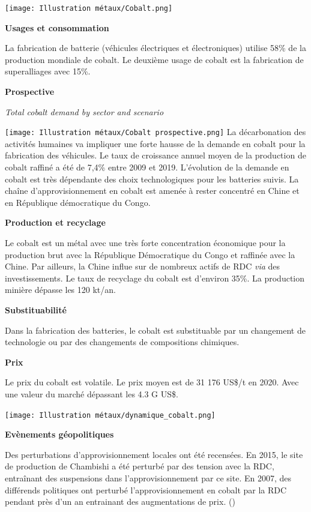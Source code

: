 \begin{center}
    \texttt{[image: Illustration métaux/Cobalt.png]}
\end{center}

\begin{center}
    \textbf{Usages et consommation}
\end{center}
La fabrication de batterie (véhicules électriques et électroniques) utilise 58\% de la production mondiale de cobalt. Le deuxième usage de cobalt est la fabrication de superalliages avec 15\%.
\begin{center}
    \textbf{Prospective}
\end{center}
\begin{multicols}{2}
    \begin{center}
        \textit{Total cobalt demand by sector and scenario}
    \end{center}
    \texttt{[image: Illustration métaux/Cobalt prospective.png]}
    \vfill\null
    \columnbreak
    La décarbonation des activités humaines va impliquer une forte hausse de la demande en cobalt pour la fabrication des véhicules. Le taux de croissance annuel moyen de la production de cobalt raffiné a été de 7,4\% entre 2009 et 2019. 
    L'évolution de la demande en cobalt est très dépendante des choix technologiques pour les batteries suivis. 
    La chaîne d'approvisionnement en cobalt est amenée à rester concentré en Chine et en République démocratique du Congo.
    
    
\end{multicols}
\begin{center}
    \textbf{Production et recyclage}
\end{center}
Le cobalt est un métal avec une très forte concentration économique pour la production brut avec la République Démocratique du Congo et raffinée avec la Chine. Par ailleurs, la Chine influe sur de nombreux actifs de RDC \textit{via} des investissements. Le taux de recyclage du cobalt est d'environ 35\%. La production minière dépasse les 120 kt/an.
\begin{center}
    \textbf{Substituabilité}
\end{center}
Dans la fabrication des batteries, le cobalt est substituable par un changement de technologie ou par des changements de compositions chimiques.
\begin{center}
    \textbf{Prix}
\end{center}
Le prix du cobalt est volatile. Le prix moyen est de 31 176 US\$/t en 2020. Avec une valeur du marché dépassant les 4.3 G US\$.
\clearpage
\begin{center}
    \texttt{[image: Illustration métaux/dynamique\_cobalt.png]}
\end{center}
\begin{center}
    \textbf{Evènements géopolitiques}
\end{center}
Des perturbations d'approvisionnement locales ont été recensées. En 2015, le site de production de Chambishi a été perturbé par des tension avec la RDC, entraînant des suspensions dans l'approvisionnement par ce site. En 2007, des différends politiques ont perturbé l'approvisionnement en cobalt par la RDC pendant près d'un an entrainant des augmentations de prix. (\cite{hatayama_adopting_2018})

